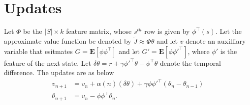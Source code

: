 \section{Updates}
Let $\Phi$ be the $|S|\times k$ feature matrix, whose $s^{th}$ row is given by $\phi^\top(s)$. Let the approximate value function be denoted by $\tilde{J}\approx \Phi \theta$ and let $v$ denote an auxilliary variable that esitmates $G=\mathbf{E}[\phi\phi^\top]$ and let $G'=\mathbf{E}[\phi\phi'^\top]$, where $\phi'$ is the feature of the next state. Let $\delta \theta=r+\gamma \phi'^\top\theta -\phi^\top \theta$ denote the temporal difference. The updates are as below
\begin{align}
v_{n+1}&=v_{n}+\alpha(n)(\delta\theta)+ \gamma\phi\phi'^\top(\theta_{n}-\theta_{n-1})\\
\theta_{n+1}&=v_n-\phi\phi^\top \theta_n.
\end{align}

